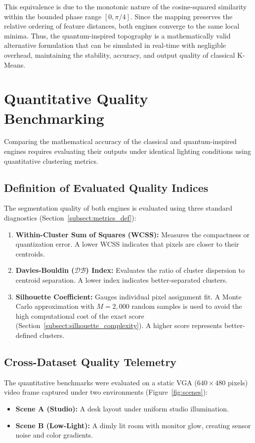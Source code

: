 This equivalence is due to the monotonic nature of the cosine-squared similarity within the bounded phase range $[0, \pi/4]$. Since the mapping preserves the relative ordering of feature distances, both engines converge to the same local minima. Thus, the quantum-inspired topography is a mathematically valid alternative formulation that can be simulated in real-time with negligible overhead, maintaining the stability, accuracy, and output quality of classical K-Means.

\section{Quantitative Quality Benchmarking}
Comparing the mathematical accuracy of the classical and quantum-inspired engines requires evaluating their outputs under identical lighting conditions using quantitative clustering metrics.

\subsection{Definition of Evaluated Quality Indices}
The segmentation quality of both engines is evaluated using three standard diagnostics (Section~\ref{subsect:metrics_def}):
\begin{enumerate}
    \item \textbf{Within-Cluster Sum of Squares (WCSS):} Measures the compactness or quantization error. A lower WCSS indicates that pixels are closer to their centroids.
    \item \textbf{Davies-Bouldin ($\mathcal{D}\mathcal{B}$) Index:} Evaluates the ratio of cluster dispersion to centroid separation. A lower index indicates better-separated clusters.
    \item \textbf{Silhouette Coefficient:} Gauges individual pixel assignment fit. A Monte Carlo approximation with $M=2,000$ random samples is used to avoid the high computational cost of the exact score (Section~\ref{subsect:silhouette_complexity}). A higher score represents better-defined clusters.
\end{enumerate}

\subsection{Cross-Dataset Quality Telemetry}\label{subsect:cross_dataset_quality_telemetry}
The quantitative benchmarks were evaluated on a static VGA ($640 \times 480$ pixels) video frame captured under two environments (Figure~\ref{fig:scenes}):
\begin{itemize}
    \item \textbf{Scene A (Studio):} A desk layout under uniform studio illumination.
    \item \textbf{Scene B (Low-Light):} A dimly lit room with monitor glow, creating sensor noise and color gradients.
\end{itemize}

